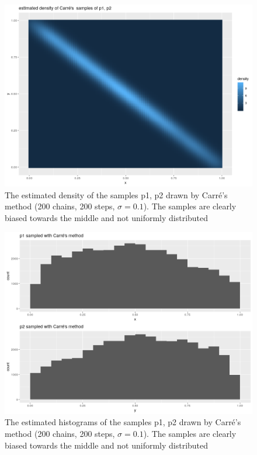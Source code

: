 	 \begin{minipage}{\linewidth}
	 	\centering
	 	\begin{minipage}{0.45\linewidth}
	 		\begin{figure}[H]
	 				\includegraphics[width=0.9\linewidth]{img/carre_estimated_density_p1_p2.png}
	 			\caption{The estimated density of the samples p1, p2 drawn by Carré's method (200 chains, 200 steps, $\sigma = 0.1$). The samples are clearly biased towards the middle and not uniformly distributed}
	 			\label{fig:carre_p1p2_estimated_dens}
	 		\end{figure}
	 	\end{minipage}
	 	\hspace{0.05\linewidth}
	 	\begin{minipage}{0.45\linewidth}
	 		\begin{figure}[H]
	 				\includegraphics[width=0.9\linewidth]{img/carre_p1_p2_hists.png}
	 			\caption{The estimated histograms of the samples p1, p2 drawn by Carré's method (200 chains, 200 steps, $\sigma = 0.1$). The samples are clearly biased towards the middle and not uniformly distributed}
	 			\label{fig:carre_p1_p2_hist}
	 		\end{figure}
	 	\end{minipage}
	 \end{minipage}


